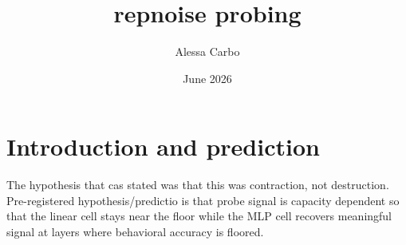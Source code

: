 \documentclass[11pt]{article}
\title{repnoise probing}
\author{Alessa Carbo}
\date{June 2026}
\begin{document}
\maketitle

\section{Introduction and prediction}
The hypothesis that cas stated was that this was contraction, not destruction. Pre-registered hypothesis/predictio is that probe signal is capacity dependent so that the linear cell stays near the floor while the MLP cell recovers meaningful signal at layers where behavioral accuracy is floored.
\end{document}
